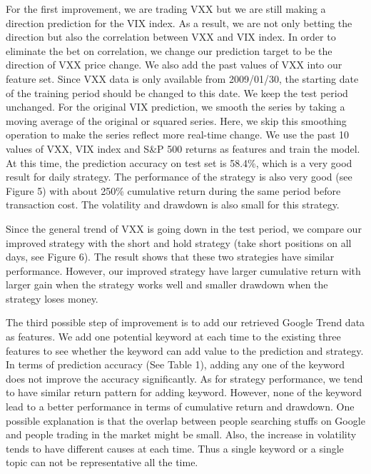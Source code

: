 \documentclass[11pt]{article}
\begin{document}
\vspace{5mm}

For the first improvement, we are trading VXX but we are still making a direction prediction for the VIX index. As a result, we are not only betting the direction but also the correlation between VXX and VIX index. In order to eliminate the bet on correlation, we change our prediction target to be the direction of VXX price change. We also add the past values of VXX into our feature set. Since VXX data is only available from 2009/01/30, the starting date of the training period should be changed to this date. We keep the test period unchanged. For the original VIX prediction, we smooth the series by taking a moving average of the original or squared series. Here, we skip this smoothing operation to make the series reflect more real-time change. We use the past 10 values of VXX, VIX index and S\&P 500 returns as features and train the model. At this time, the prediction accuracy on test set is 58.4\%, which is a very good result for daily strategy. The performance of the strategy is also very good (see Figure 5) with about 250\% cumulative return during the same period before transaction cost. The volatility and drawdown is also small for this strategy.

\vspace{5mm}

Since the general trend of VXX is going down in the test period, we compare our improved strategy with the short and hold strategy (take short positions on all days, see Figure 6). The result shows that these two strategies have similar performance. However, our improved strategy have larger cumulative return with larger gain when the strategy works well and smaller drawdown when the strategy loses money.

\vspace{5mm}
The third possible step of improvement is to add our retrieved Google Trend data as features. We add one potential keyword at each time to the existing three features to see whether the keyword can add value to the prediction and strategy. In terms of prediction accuracy (See Table 1), adding any one of the keyword does not improve the accuracy significantly. As for strategy performance, we tend to have similar return pattern for adding keyword. However, none of the keyword lead to a better performance in terms of cumulative return and drawdown. One possible explanation is that the overlap between people searching stuffs on Google and people trading in the market might be small. Also, the increase in volatility tends to have different causes at each time. Thus a single keyword or a single topic can not be representative all the time.
\end{document}
